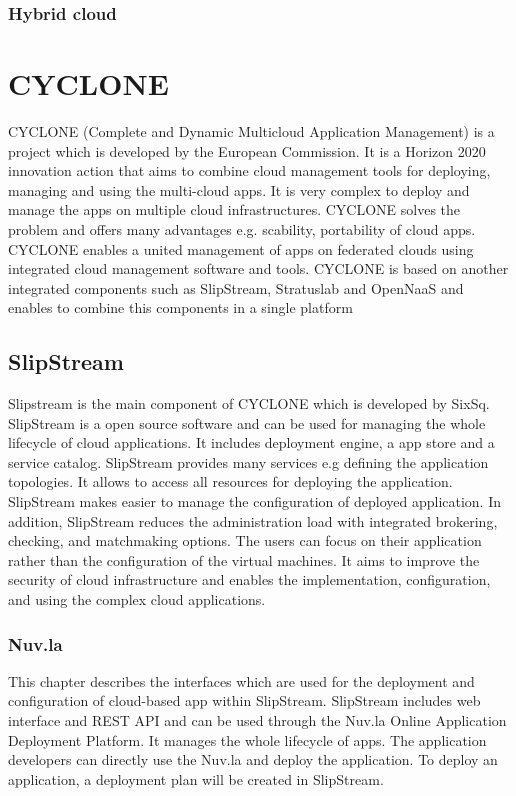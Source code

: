 \subsubsection{Hybrid cloud}

\section{CYCLONE}
CYCLONE (Complete and Dynamic Multicloud Application Management) is a project which is developed by the European Commission. It is a Horizon 2020 innovation action that aims to combine cloud management tools for deploying, managing and using the multi-cloud apps. It is very complex to deploy and manage the apps on multiple cloud infrastructures. CYCLONE solves the problem and offers many advantages e.g. scability, portability of  cloud apps. CYCLONE enables a united management of apps on federated clouds using integrated cloud management software and tools. 
CYCLONE is based on another integrated components such as SlipStream, Stratuslab and OpenNaaS and enables to combine this components in a single platform

\subsection{SlipStream}
Slipstream is the main component of CYCLONE which is developed by SixSq.  SlipStream  is a open source software and can be  used for managing the whole lifecycle of cloud applications. It includes deployment engine, a app store and a service catalog.  SlipStream provides many services e.g defining the application topologies. It allows to access all resources for deploying the application. SlipStream makes easier to manage the configuration of deployed application. In addition, SlipStream reduces the administration load with integrated brokering, checking, and matchmaking options.  The users can focus on their application rather than the configuration of the virtual machines. It aims to improve the security of cloud infrastructure and enables the implementation, configuration, and using the complex cloud applications.

\subsubsection{Nuv.la} 

This chapter describes the interfaces which are used for the deployment and configuration of cloud-based app within SlipStream. SlipStream includes web interface and REST API and can be used through the Nuv.la Online Application Deployment Platform. It manages the whole lifecycle of apps. The application developers can directly use the Nuv.la and deploy the application. To deploy an application, a deployment plan will be created in SlipStream. 


